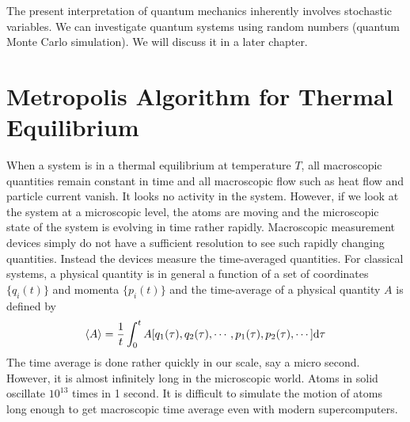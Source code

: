 The present interpretation of quantum mechanics inherently involves stochastic variables. We can investigate quantum systems using random numbers (quantum Monte Carlo simulation).  We will discuss it in a later chapter.


\section{Metropolis Algorithm for Thermal Equilibrium}

When a system is in a thermal equilibrium at temperature $T$, all macroscopic quantities remain constant in time and all macroscopic flow such as heat flow and particle current vanish.  It looks no activity in the system.  However, if we look at the system at a microscopic level, the atoms are moving and the microscopic state of the system is evolving in time rather rapidly.  Macroscopic measurement devices simply do not have a sufficient resolution  to see such rapidly changing quantities. Instead the devices measure the time-averaged quantities.  For classical systems, a physical quantity is in general a function of a set of coordinates $\{q_i(t)\}$ and momenta $\{p_i(t)\}$ and the time-average of a physical quantity $A$ is defined by
\begin{equation}
\langle A \rangle = \frac{1}{t} \int_0^t A[q_1(\tau),q_2(\tau), \cdots,  p_1(\tau), p_2(\tau), \cdots] \text{d} \tau
\end{equation}
The time average is done rather quickly in our scale, say a micro second.  However, it is almost infinitely long in the microscopic world.  Atoms in solid oscillate $10^{13}$ times in 1 second.   It is difficult to simulate the motion of atoms long enough to get macroscopic time average even with modern supercomputers.

